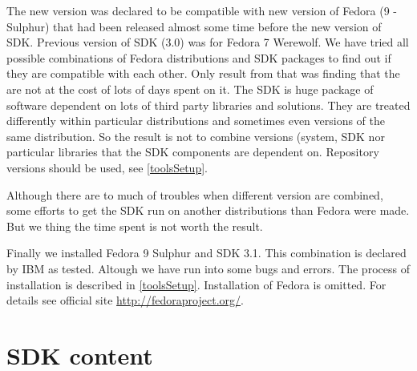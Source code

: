 \par
The new version was declared to be compatible with new version of Fedora (9 - Sulphur) that had been released almost some time before the new version of SDK.
Previous version of SDK (3.0) was for Fedora 7 Werewolf.
We have tried all possible combinations of Fedora distributions and SDK packages to find out if they are compatible with each other.
Only result from that was finding that the are not at the cost of lots of days spent on it.
The SDK is huge package of software dependent on lots of third party libraries and solutions.
They are treated differently within particular distributions and sometimes even versions of the same distribution.
So the result is not to combine versions (system, SDK nor particular libraries that the SDK components are dependent on.
Repository versions should be used, see \ref{toolsSetup}.

\par
Although there are to much of troubles when different version are combined, some efforts to get the SDK run on another distributions than Fedora were made.
But we thing the time spent is not worth the result.

\par
Finally we installed Fedora 9 Sulphur and SDK 3.1.
This combination is declared by IBM as tested.
Altough we have run into some bugs and errors.
The process of installation is described in \ref{toolsSetup}.
Installation of Fedora is omitted.
For details see official site \url{http://fedoraproject.org/}.

\section {SDK content}

